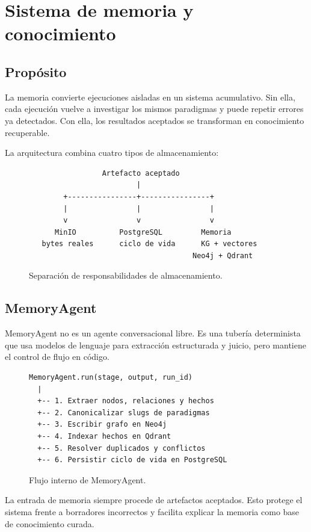 \chapter{Sistema de memoria y conocimiento}

\section{Propósito}

La memoria convierte ejecuciones aisladas en un sistema acumulativo. Sin ella,
cada ejecución vuelve a investigar los mismos paradigmas y puede repetir errores
ya detectados. Con ella, los resultados aceptados se transforman en conocimiento
recuperable.

La arquitectura combina cuatro tipos de almacenamiento:

\begin{figure}[H]
\centering
\begin{verbatim}
                 Artefacto aceptado
                         |
        +----------------+----------------+
        |                |                |
        v                v                v
      MinIO          PostgreSQL         Memoria
   bytes reales      ciclo de vida      KG + vectores
                                      Neo4j + Qdrant
\end{verbatim}
\caption{Separación de responsabilidades de almacenamiento.}
\end{figure}

\section{MemoryAgent}

MemoryAgent no es un agente conversacional libre. Es una tubería determinista
que usa modelos de lenguaje para extracción estructurada y juicio, pero mantiene
el control de flujo en código.

\begin{figure}[H]
\centering
\begin{verbatim}
MemoryAgent.run(stage, output, run_id)
  |
  +-- 1. Extraer nodos, relaciones y hechos
  +-- 2. Canonicalizar slugs de paradigmas
  +-- 3. Escribir grafo en Neo4j
  +-- 4. Indexar hechos en Qdrant
  +-- 5. Resolver duplicados y conflictos
  +-- 6. Persistir ciclo de vida en PostgreSQL
\end{verbatim}
\caption{Flujo interno de MemoryAgent.}
\end{figure}

La entrada de memoria siempre procede de artefactos aceptados. Esto protege el
sistema frente a borradores incorrectos y facilita explicar la memoria como
base de conocimiento curada.

